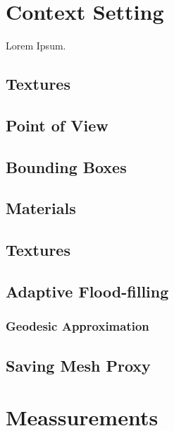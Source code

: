 \section{Context Setting}
\label{topstoc4}

Lorem Ipsum.

\subsection{Textures}
\label{topstoc41}

\subsection{Point of View}
\label{topstoc42}

\subsection{Bounding Boxes}
\label{topstoc43}

\subsection{Materials}
\label{topstoc44}

\subsection{Textures}
\label{topstoc45}

\subsection{Adaptive Flood-filling}
\label{topstoc46}

\subsubsection{Geodesic Approximation}
\label{topstoc461}

\subsection{Saving Mesh Proxy}
\label{topstoc47}

\newpage
\section{Meassurements}
\label{topstoc5}



